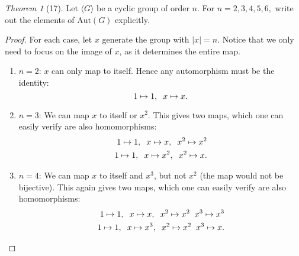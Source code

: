 \documentclass[12pt]{article}
\theoremstyle{remark}
\theoremstyle{named}
\newtheorem*{theorem}{Theorem}
\newcommand{\Aut}{\text{Aut}}
\begin{document}
\begin{theorem}[17]
    Let \(\langle G \rangle\) be a cyclic group of order \(n\). For \(n = 2, 3, 4, 5, 6,\) write out the elements of \(\Aut(G)\) explicitly.
\end{theorem}
\begin{proof}
    For each case, let \(x\) generate the group with \(|x| = n\). Notice that we only need to focus on the image of \(x\), as it determines the entire map. 
    \begin{enumerate}
        \item[]\(n = 2\): \(x\) can only map to itself. Hence any automorphism must be the identity: 
        \[1 \mapsto 1, \hspace{2mm} x \mapsto x.\] 
        
        \item[]\(n = 3\): We can map \(x\) to itself or \(x^2\). This gives two maps, which one can easily verify are also homomorphisms:
        \begin{align*}
            1 \mapsto 1, \hspace{2mm} x \mapsto x, \hspace{2mm} x^2 \mapsto x^2 \\
            1 \mapsto 1, \hspace{2mm} x \mapsto x^2, \hspace{2mm} x^2 \mapsto x.
        \end{align*} 
        
        \item[]\(n = 4\): We can map \(x\) to itself and \(x^3\), but not \(x^2\) (the map would not be bijective). This again gives two maps, which one can easily verify are also homomorphisms:
        \begin{align*}
            1 \mapsto 1, \hspace{2mm} x \mapsto x, \hspace{2mm} x^2 \mapsto x^2 \hspace{2mm} x^3 \mapsto x^3 \\
            1 \mapsto 1, \hspace{2mm} x \mapsto x^3, \hspace{2mm} x^2 \mapsto x^2 \hspace{2mm} x^3 \mapsto x.
        \end{align*} 
        

\end{enumerate}
\end{proof}
\end{document}
